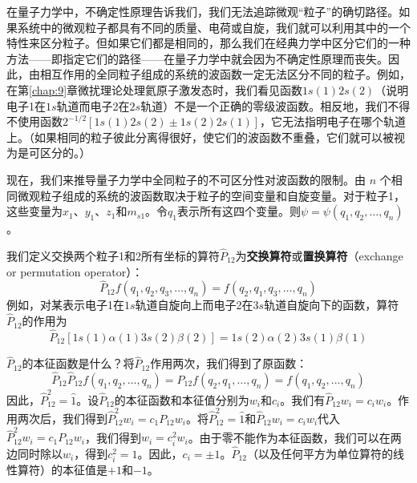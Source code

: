    在量子力学中，不确定性原理告诉我们，我们无法追踪微观“粒子”的确切路径。如果系统中的微观粒子都具有不同的质量、电荷或自旋，我们就可以利用其中的一个特性来区分粒子。但如果它们都是相同的，那么我们在经典力学中区分它们的一种方法——即指定它们的路径——在量子力学中就会因为不确定性原理而丧失。因此，由相互作用的全同粒子组成的系统的波函数一定无法区分不同的粒子。例如，在第\ref{chap:9}章微扰理论处理氦原子激发态时，我们看见函数$1s\left(1\right)2s\left(2\right)$（说明电子1在$1s$轨道而电子2在$2s$轨道）不是一个正确的零级波函数。相反地，我们不得不使用函数$2^{-1/2}\left[1s\left(1\right)2s\left(2\right) \pm 1s\left(2\right)2s\left(1\right)\right]$，它无法指明电子在哪个轨道上。（如果相同的粒子彼此分离得很好，使它们的波函数不重叠，它们就可以被视为是可区分的。）

    现在，我们来推导量子力学中全同粒子的不可区分性对波函数的限制。由 $n$ 个相同微观粒子组成的系统的波函数取决于粒子的空间变量和自旋变量。对于粒子1，这些变量为$x_1$、$y_1$、$z_1$和$m_{s1}$。令$q_1$表示所有这四个变量。则$\psi = \psi\left(q_1, q_2, \ldots, q_n\right)$。

    我们定义交换两个粒子1和2所有坐标的算符$\hat{P}_{12}$为\textbf{交换算符}或\textbf{置换算符}（exchange or permutation operator）：
    \begin{equation}
        \boxed{
            \hat{P}_{12} f\left(q_1, q_2, q_3, \ldots, q_n\right) = f\left(q_2, q_1, q_3, \ldots, q_n\right)
        }
        \label{eq:10.14}
    \end{equation}
    例如，对某表示电子1在$1s$轨道自旋向上而电子2在$3s$轨道自旋向下的函数，算符$\hat{P}_{12}$的作用为
    \begin{equation}
        \hat{P}_{12}\left[1s\left(1\right)\alpha\left(1\right)3s\left(2\right)\beta\left(2\right)\right] = 1s\left(2\right)\alpha\left(2\right)3s\left(1\right)\beta\left(1\right)
        \label{eq:10.15}
    \end{equation}

    $\hat{P}_{12}$的本征函数是什么？将$\hat{P}_{12}$作用两次，我们得到了原函数：
    \begin{equation*}
        \hat{P}_{12} \hat{P}_{12} f\left(q_1, q_2, \ldots, q_n\right) = \hat{P}_{12} f\left(q_2, q_1, \ldots, q_n\right) = f\left(q_1, q_2, ..., q_n\right)
    \end{equation*}
    因此，$\hat{P}_{12}^2 = \hat{1}$。设$\hat{P}_{12}$的本征函数和本征值分别为$w_i$和$c_i$。我们有$\hat{P}_{12} w_i = c_i w_i$。作用两次后，我们得到$\hat{P}_{12}^2 w_i = c_1 P_{12} w_i$。将$\hat{P}_{12}^2 = \hat{1}$和$\hat{P}_{12} w_i = c_i w_i$代入$\hat{P}_{12}^2 w_i = c_1 P_{12} w_i$，我们得到$w_i = c_i^2 w_i$。由于零不能作为本征函数，我们可以在两边同时除以$w_i$，得到$c_i^2 = 1$。因此，$c_i = \pm 1$。$\hat{P}_{12}$（以及任何平方为单位算符的线性算符）的本征值是$+1$和$-1$。

